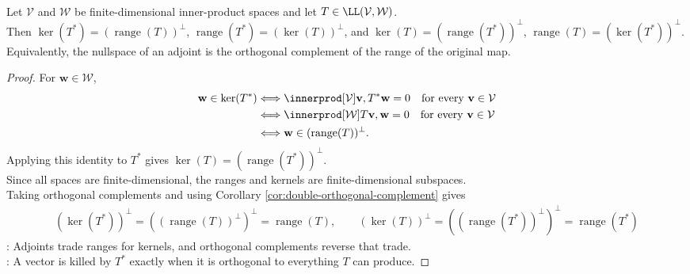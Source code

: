 \begin{proposition} \label{prop:adjoint-kernel-range-orthogonality} \\
Let $\mathcal{V}$ and $\mathcal{W}$ be finite-dimensional inner-product spaces and let $T\in\LL(\mathcal{V},\mathcal{W})$.\\
Then $\ker(T^*)=(\operatorname{range}(T))^{\perp}$, $\operatorname{range}(T^*)=(\ker(T))^{\perp}$, and $\ker(T)=(\operatorname{range}(T^*))^{\perp}$, $\operatorname{range}(T)=(\ker(T^*))^{\perp}$.\\
Equivalently, the nullspace of an adjoint is the orthogonal complement of the range of the original map.
\begin{proof}
For $\mathbf{w}\in\mathcal{W}$,
\begin{align}
\mathbf{w}\in\ker(T^*)
&\Longleftrightarrow \innerprod[\mathcal{V}]{\mathbf{v},T^*\mathbf{w}}=0\quad\text{for every }\mathbf{v}\in\mathcal{V} \nonumber\\
&\Longleftrightarrow \innerprod[\mathcal{W}]{T\mathbf{v},\mathbf{w}}=0\quad\text{for every }\mathbf{v}\in\mathcal{V} \nonumber\\
&\Longleftrightarrow \mathbf{w}\in(\operatorname{range}(T))^{\perp}.
\nonumber
\end{align}
Applying this identity to $T^*$ gives $\ker(T)=(\operatorname{range}(T^*))^{\perp}$.\\
Since all spaces are finite-dimensional, the ranges and kernels are finite-dimensional subspaces.\\
Taking orthogonal complements and using Corollary \ref{cor:double-orthogonal-complement} gives
\begin{align}
(\ker(T^*))^{\perp}=((\operatorname{range}(T))^{\perp})^{\perp}=\operatorname{range}(T),
\qquad
(\ker(T))^{\perp}=((\operatorname{range}(T^*))^{\perp})^{\perp}=\operatorname{range}(T^*) \nonumber
\end{align}
: Adjoints trade ranges for kernels, and orthogonal complements reverse that trade.\\
: A vector is killed by $T^*$ exactly when it is orthogonal to everything $T$ can produce.
\end{proof}
\end{proposition}

